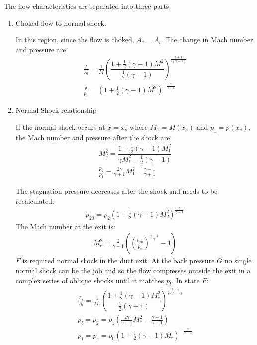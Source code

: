 \documentclass[class=report, crop=false, 12pt,a4paper]{standalone}
\begin{document}
The flow characteristics are separated into three parts:
\begin{enumerate}
    \item Choked flow to normal shock.

          In this region, since the flow is choked, $A_* = A_t$. The change in Mach number and pressure are:
          \begin{gather}
              \frac{A}{A_t} = \frac{1}{M}\left(\dfrac{1 + \frac{1}{2}\left(\gamma - 1\right)M^2}{\frac{1}{2}\left(\gamma + 1\right)}\right)^{\frac{\gamma + 1}{2\left(\gamma -1\right)}}\\
              \frac{p}{p_0} = \left(1 + \frac{1}{2}\left(\gamma -1\right)M^2\right)^{-\frac{\gamma}{\gamma -1}}
          \end{gather}
    \item Normal Shock relationship

          If the normal shock occurs at $x = x_s$ where $M_1 = M(x_s)$ and $p_1 = p(x_s)$, the Mach number and pressure after the shock are:
          \begin{gather}
              M^2_2 = \dfrac{1 + \frac{1}{2}\left(\gamma - 1\right)M^2_1}{\gamma M^2_1 - \frac{1}{2}\left(\gamma - 1\right)}\\
              \frac{p_2}{p_1} = \frac{2\gamma}{\gamma + 1}M^2_1 - \frac{\gamma -1}{\gamma + 1}
          \end{gather}

          The stagnation pressure decreases after the shock and needs to be recalculated:
          \begin{gather}
              p_{20} = p_2 \left(1 + \frac{1}{2}\left(\gamma - 1\right)M^2_2\right)^{\frac{\gamma }{\gamma -1}}
          \end{gather}
          The Mach number at the exit is:
          \begin{gather}
              M^2_e = \frac{2}{\gamma - 1}\left(\left(\frac{p_{20}}{p_e}\right)^{\frac{\gamma -1}{\gamma}}-1\right)
          \end{gather}
          $F$ is required normal shock in the duct exit. At the back pressure $G$ no single normal shock can be the job and so the flow compresses outside the exit in a complex series of oblique shocks until it matches $p_b$. In state $F$:
          \begin{gather}
              \frac{A_e}{A_t} = \frac{1}{M_e}\left(\dfrac{1+ \frac{1}{2}\left(\gamma -1\right)M^2_e}{\frac{1}{2}\left(\gamma + 1\right)}\right)^{\frac{\gamma + 1}{2\left(\gamma - 1\right)}}\\
              p_b = p_2 = p_1 \left(\frac{2\gamma}{\gamma + 1}M^2_e-\frac{\gamma -1}{\gamma + 1}\right)\\
              p_1 = p_e = p_0\left(1 + \frac{1}{2}\left(\gamma - 1\right)M_e\right)^{-\frac{\gamma}{\gamma -1}}
          \end{gather}
\end{enumerate}
\end{document}
